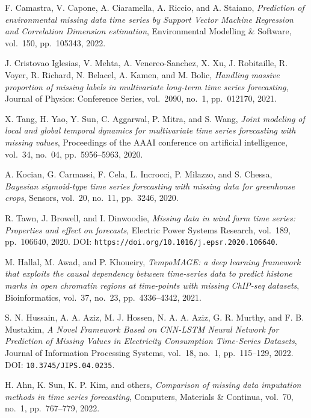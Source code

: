 \begin{enumerate}[label={[S\arabic*]}]
    \item %
    F. Camastra, V. Capone, A. Ciaramella, A. Riccio, and A. Staiano, \textit{Prediction of environmental missing data time series by Support Vector Machine Regression and Correlation Dimension estimation}, Environmental Modelling \& Software, vol.~150, pp.~105343, 2022.
    \item %
    J. Cristovao Iglesias, V. Mehta, A. Venereo-Sanchez, X. Xu, J. Robitaille, R. Voyer, R. Richard, N. Belacel, A. Kamen, and M. Bolic, \textit{Handling massive proportion of missing labels in multivariate long-term time series forecasting}, Journal of Physics: Conference Series, vol.~2090, no.~1, pp.~012170, 2021.
    \item %
    X. Tang, H. Yao, Y. Sun, C. Aggarwal, P. Mitra, and S. Wang, \textit{Joint modeling of local and global temporal dynamics for multivariate time series forecasting with missing values}, Proceedings of the AAAI conference on artificial intelligence, vol.~34, no.~04, pp.~5956–5963, 2020.
    \item %
    A. Kocian, G. Carmassi, F. Cela, L. Incrocci, P. Milazzo, and S. Chessa, \textit{Bayesian sigmoid-type time series forecasting with missing data for greenhouse crops}, Sensors, vol.~20, no.~11, pp.~3246, 2020.
    \item %
    R. Tawn, J. Browell, and I. Dinwoodie, \textit{Missing data in wind farm time series: Properties and effect on forecasts}, Electric Power Systems Research, vol.~189, pp.~106640, 2020. DOI: \texttt{https://doi.org/10.1016/j.epsr.2020.106640}.
    \item %
    M. Hallal, M. Awad, and P. Khoueiry, \textit{TempoMAGE: a deep learning framework that exploits the causal dependency between time-series data to predict histone marks in open chromatin regions at time-points with missing ChIP-seq datasets}, Bioinformatics, vol.~37, no.~23, pp.~4336–4342, 2021.
    \item %
    S. N. Hussain, A. A. Aziz, M. J. Hossen, N. A. A. Aziz, G. R. Murthy, and F. B. Mustakim, \textit{A Novel Framework Based on CNN-LSTM Neural Network for Prediction of Missing Values in Electricity Consumption Time-Series Datasets}, Journal of Information Processing Systems, vol.~18, no.~1, pp.~115–129, 2022. DOI: \texttt{10.3745/JIPS.04.0235}.
    \item %
    H. Ahn, K. Sun, K. P. Kim, and others, \textit{Comparison of missing data imputation methods in time series forecasting}, Computers, Materials \& Continua, vol.~70, no.~1, pp.~767–779, 2022.

\end{enumerate}
